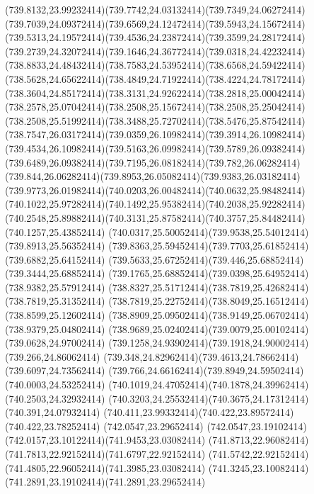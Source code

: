 {{	\curveto(739.8132,23.99232414)(739.7742,24.03132414)(739.7349,24.06272414)
	\curveto(739.7039,24.09372414)(739.6569,24.12472414)(739.5943,24.15672414)
	\curveto(739.5313,24.19572414)(739.4536,24.23872414)(739.3599,24.28172414)
	\curveto(739.2739,24.32072414)(739.1646,24.36772414)(739.0318,24.42232414)
	\curveto(738.8833,24.48432414)(738.7583,24.53952414)(738.6568,24.59422414)
	\curveto(738.5628,24.65622414)(738.4849,24.71922414)(738.4224,24.78172414)
	\curveto(738.3604,24.85172414)(738.3131,24.92622414)(738.2818,25.00042414)
	\curveto(738.2578,25.07042414)(738.2508,25.15672414)(738.2508,25.25042414)
	\curveto(738.2508,25.51992414)(738.3488,25.72702414)(738.5476,25.87542414)
	\curveto(738.7547,26.03172414)(739.0359,26.10982414)(739.3914,26.10982414)
	\curveto(739.4534,26.10982414)(739.5163,26.09982414)(739.5789,26.09382414)
	\curveto(739.6489,26.09382414)(739.7195,26.08182414)(739.782,26.06282414)
	\curveto(739.844,26.06282414)(739.8953,26.05082414)(739.9383,26.03182414)
	\curveto(739.9773,26.01982414)(740.0203,26.00482414)(740.0632,25.98482414)
	\curveto(740.1022,25.97282414)(740.1492,25.95382414)(740.2038,25.92282414)
	\curveto(740.2548,25.89882414)(740.3131,25.87582414)(740.3757,25.84482414)
	\lineto(740.1257,25.43852414)
	\curveto(740.0317,25.50052414)(739.9538,25.54012414)(739.8913,25.56352414)
	\curveto(739.8363,25.59452414)(739.7703,25.61852414)(739.6882,25.64152414)
	\curveto(739.5633,25.67252414)(739.446,25.68852414)(739.3444,25.68852414)
	\curveto(739.1765,25.68852414)(739.0398,25.64952414)(738.9382,25.57912414)
	\curveto(738.8327,25.51712414)(738.7819,25.42682414)(738.7819,25.31352414)
	\curveto(738.7819,25.22752414)(738.8049,25.16512414)(738.8599,25.12602414)
	\curveto(738.8909,25.09502414)(738.9149,25.06702414)(738.9379,25.04802414)
	\curveto(738.9689,25.02402414)(739.0079,25.00102414)(739.0628,24.97002414)
	\curveto(739.1258,24.93902414)(739.1918,24.90002414)(739.266,24.86062414)
	\curveto(739.348,24.82962414)(739.4613,24.78662414)(739.6097,24.73562414)
	\curveto(739.766,24.66162414)(739.8949,24.59502414)(740.0003,24.53252414)
	\curveto(740.1019,24.47052414)(740.1878,24.39962414)(740.2503,24.32932414)
	\curveto(740.3203,24.25532414)(740.3675,24.17312414)(740.391,24.07932414)
	\curveto(740.411,23.99332414)(740.422,23.89572414)(740.422,23.78252414)
	\closepath
	\moveto(742.0547,23.29652414)
	\curveto(742.0547,23.19102414)(742.0157,23.10122414)(741.9453,23.03082414)
	\curveto(741.8713,22.96082414)(741.7813,22.92152414)(741.6797,22.92152414)
	\curveto(741.5742,22.92152414)(741.4805,22.96052414)(741.3985,23.03082414)
	\curveto(741.3245,23.10082414)(741.2891,23.19102414)(741.2891,23.29652414)
}}
